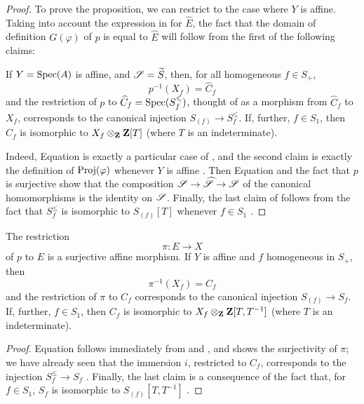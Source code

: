 \begin{proof}
\label{proof-2.8.3.5}
To prove the proposition, we can restrict to the case where $Y$ is affine.
Taking into account the expression in  for $\widehat{E}$, the fact that the domain of definition $G(\varphi)$ of $p$ is equal to $\widehat{E}$ will follow from the first of the following claims:
\begin{env}[8.3.5.3]
\label{2.8.3.5.3}
If $Y=\operatorname{Spec}(A)$ is affine, and $\mathscr{S}=\widetilde{S}$, then, for all homogeneous $f\in S_+$,
\[
\label{eq:2.8.3.5.4}
  p^{-1}(X_f) = \widehat{C}_f
\tag{8.3.5.4}
\]
and the restriction of $p$ to $\widehat{C}_f=\operatorname{Spec}(S_f^\leqslant)$, thought of as a morphism from $\widehat{C}_f$ to $X_f$, corresponds to the canonical injection $S_{(f)}\to S_f^\leq$.
If, further, $f\in S_1$, then $\widehat{C}_f$ is isomorphic to $X_f\otimes_{\mathbf{Z}}\mathbf{Z}[T]$ (where $T$ is an indeterminate).
\end{env}

Indeed, Equation  is exactly a particular case of , and the second claim is exactly the definition of $\operatorname{Proj}(\varphi)$ whenever $Y$ is affine .
Then Equation  and the fact that $p$ is surjective show that the composition $\sh{S}\to\widehat{\sh{S}}\to\sh{S}$ of the canonical homomorphisms is the identity on $\mathscr{S}$.
Finally, the last claim of  follows from the fact that $S_f^\leq$ is isomorphic to $S_{(f)}[T]$ whenever $f\in S_1$ .
\end{proof}

\begin{corollary}[8.3.6]
\label{2.8.3.6}
The restriction
\[
\label{eq:2.8.3.6.1}
  \pi: E \to X
\tag{8.3.6.1}
\]
of $p$ to $E$ is a surjective affine morphism.
If $Y$ is affine and $f$ homogeneous in $S_+$, then
\[
\label{eq:2.8.3.6.2}
  \pi^{-1}(X_f) = C_f
\tag{8.3.6.2}
\]
and the restriction of $\pi$ to $C_f$ corresponds to the canonical injection $S_{(f)}\to S_f$.
If, further, $f\in S_1$, then $C_f$ is isomorphic to $X_f\otimes_{\mathbf{Z}}\mathbf{Z}[T,T^{-1}]$ (where $T$ is an indeterminate).
\end{corollary}

\begin{proof}
\label{proof-2.8.3.6}
Equation  follows immediately from  and , and shows the surjectivity of $\pi$;
we have already seen that the immersion $i$, restricted to $C_f$, corresponds
to the injection $S_f^\leq\to S_f$ .
Finally, the last claim is a consequence of the fact that, for $f\in S_1$, $S_f$ is isomorphic to $S_{(f)}[T,T^{-1}]$ .
\end{proof}

